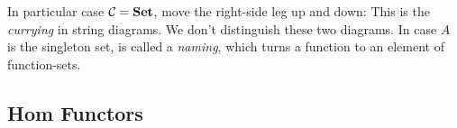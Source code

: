 In particular case $\mathcal{C} = \boldsymbol{\mathrm{Set}}$, move the right-side leg up and down:
This is the \textit{currying} in string diagrams. %
We don't distinguish these two diagrams.
\mynewline
In case $A$ is the singleton set,
is called a \textit{naming}, which turns a function to an element of function-sets.


\subsection{Hom Functors}

